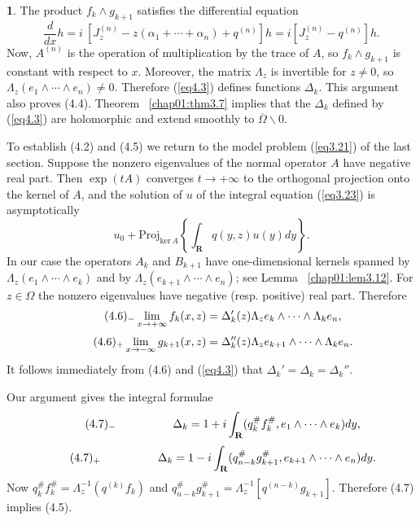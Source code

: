 \documentclass{surv-l}
\theoremstyle{plain}
\theoremstyle{definition}
\newtheorem*{pf}{\sc{Proof}}
\numberwithin{equation}{chapter}
\begin{document}
\begin{pf}
The product $f_{k}\wedge g_{k+1}$ satisfies the differential equation
\begin{equation*}
\frac{d}{dx}h=i\ [J_{z}^{(n)}-z(\alpha_{1}+\cdots +\alpha_{n})+q^{(n)}]h=i[J_{z}^{(n)}-q^{(n)}]h.
\end{equation*}
Now, $A^{(n)}$ is the operation of multiplication by the trace of $A$, so $f_{k}\wedge g_{k+1}$ is constant with respect to $x$. Moreover, the matrix $\Lambda_{z}$ is invertible for $z\neq 0$, so $\Lambda_{z}(e_{1}\wedge\cdots \wedge e_{n})\neq 0$. Therefore (\ref{eq4.3}) defines functions $\Delta_{k}$. This argument also proves (4.4). Theorem ~\ref{chap01:thm3.7} implies that the $\Delta_{k}$ defined by (\ref{eq4.3}) are holomorphic and extend smoothly to $\overline{\Omega}\backslash 0$.

To establish (4.2) and (4.5) we return to the model problem (\ref{eq3.21}) of the last section. Suppose the nonzero eigenvalues of the normal operator $A$ have negative real part. Then $\exp(tA)$ converges $ t\rightarrow+\infty$ to the orthogonal projection onto the kernel of $A$, and the solution of $u$ of the integral equation (\ref{eq3.23}) is asymptotically
\begin{equation*}
u_{0}+\mathrm{Proj}_{\mathrm{ker}\,A}\left\{\int_{\mathbf{R}}q(y, z)u(y)dy\right\}.
\end{equation*}
In our case the operators $A_{k}$ and $B_{k+1}$ have one-dimensional kernels spanned by $\Lambda_{z}(e_{1}\wedge\cdots\wedge e_{k})$ and by $\Lambda_{z}(e_{k+1}\wedge\cdots\wedge e_{n})$; see Lemma ~\ref{chap01:lem3.12}. For $ z\in\Omega$ the nonzero eigenvalues have negative (resp. positive) real part. Therefore
\begin{equation*}
\tag*{$(4.6)_{-}$} \displaystyle \lim_{x\rightarrow+\infty}  f_{k}(x, z)=\Delta_{k}'(z)\Lambda_{z}e_{k}\wedge\cdots\wedge\Lambda_{k}e_{n},
\end{equation*}
\begin{equation*}
\tag*{$(4.6)_{+}$} \displaystyle \lim_{x\rightarrow-\infty} g_{k+1}(x, z)=\Delta_{k}''(z)\Lambda_{z}e_{k+1}\wedge\cdots\wedge\Lambda_{k}e_{n}.
\end{equation*}
It follows immediately from (4.6) and (\ref{eq4.3}) that $\Delta_{k}'=\Delta_{k}=\Delta_{k}''$.

Our argument gives the integral formulae
\begin{equation*}
\tag*{$(4.7)_{-}$}\qquad \qquad \quad \displaystyle \Delta_{k}=1+i\int_{\mathbf{R}}(q_{k}^{\#}f_{k}^{\#}, e_{1}\wedge\cdots\wedge e_{k}) dy,
\end{equation*}
\begin{equation*}
\tag*{$(4.7)_{+}$} \qquad \qquad \quad \displaystyle \Delta_{k}=1-i\int_{\mathbf{R}}(q_{n-k}^{\#}g_{k+1}^{\#},e_{k+1}\wedge\cdots\wedge e_{n}) dy.
\end{equation*}
Now $q_{k}^{\#}f_{k}^{\#}=\Lambda_{z}^{-1}(q^{(k)}f_{k})$ and $q_{n-k}^{\#}g_{k+1}^{\#}=\Lambda_{z}^{-1}[q^{(n-k)}g_{k+1}]$. Therefore (4.7) implies (4.5).
\end{pf}
\end{document}
